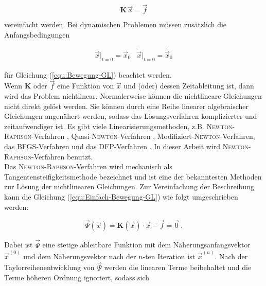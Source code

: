	\begin{equation}\label{equ:Einfach-Bewegung-GL}
	\mathbf{K}\, \vec{x} = \vec{f}
	\end{equation}
	
	vereinfacht werden. Bei dynamischen Problemen müssen zusätzlich die Anfangsbedingungen
	
	\begin{equation}\label{equ:Anfangsbedingung-Bewegung-GL}
	\begin{array}{cc}
	\vec{x}|_{t=0}=\vec{x}_{0} & \dot{\vec{x}}|_{t=0}=\dot{\vec{x}}_{0}
	\end{array}
	\end{equation}
	
	für Gleichung (\ref{equ:Bewegung-GL}) beachtet werden.\\
	
	Wenn $ \mathbf{K} $ oder $\vec{f}$ eine Funktion von $ \vec{x} $ und (oder) dessen Zeitableitung ist, dann wird das Problem nichtlinear. Normalerweise können die nichtlineare Gleichungen nicht direkt gelöst werden. Sie können durch eine Reihe linearer algebraischer Gleichungen angenähert werden, sodass das Lösungsverfahren komplizierter und zeitaufwendiger ist. Es gibt viele Linearisierungsmethoden, z.B. \textsc{Newton}-\textsc{Raphson}-Verfahren \cite{rust2011nichtlineare}, Quasi-\textsc{Newton}-Verfahren \cite{luenberger1984linear}, Modifiziert-\textsc{Newton}-Verfahren, das BFGS-Verfahren und das DFP-Verfahren \cite{matthies1979solution}. In dieser Arbeit wird \textsc{Newton}-\textsc{Raphson}-Verfahren benutzt.\\
	
	Das \textsc{Newton}-\textsc{Raphson}-Verfahren wird mechanisch als Tangentensteifigkeitsmethode bezeichnet und ist eine der bekanntesten Methoden zur Lösung der nichtlinearen Gleichungen. Zur Vereinfachung der Beschreibung kann die Gleichung (\ref{equ:Einfach-Bewegung-GL}) wie folgt umgeschrieben werden:
	
	\begin{equation}\label{equ:Newton-Vereinfach-Bewegung-GL}
	\vec{\varPsi}(\vec{x}) = \mathbf{K}(\vec{x}) \cdot \vec{x}-\vec{f}=\vec{0} \ .
	\end{equation}
	
	Dabei ist $ \vec{\varPsi} $ eine stetige ableitbare Funktion mit dem Näherungsanfangsvektor $ \vec{x}^{(0)} $ und dem Näherungsvektor nach der $n$-ten Iteration ist $ \vec{x}^{(n)} $. Nach der Taylorreihenentwicklung von $ \vec{\varPsi} $ werden die linearen Terme beibehaltet und die Terme höheren Ordnung ignoriert, sodass sich
	
